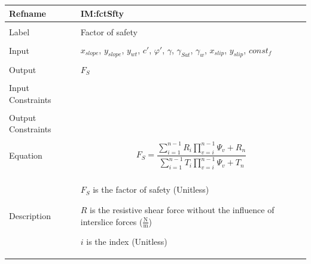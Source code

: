 \documentclass[12pt]{article}
\begin{document}
\noindent \begin{minipage}{\textwidth}
\begin{tabular}{p{} p{}}
\toprule \textbf{Refname} & \textbf{IM:fctSfty}
\label{IM:fctSfty}
\\ \midrule \\
Label & Factor of safety
        \\ \midrule \\
        Input & ${x_{slope}}$, ${y_{slope}}$, ${y_{wt}}$, $c'$, $φ'$, $γ$, ${γ_{Sat}}$, ${γ_{w}}$, ${x_{slip}}$, ${y_{slip}}$, $const_f$
                \\ \midrule \\
                Output & ${F_{S}}$
                         \\ \midrule \\
                         Input Constraints & \\ \midrule \\
                                             Output Constraints & \\ \midrule \\
                                                                  Equation & \begin{displaymath}
                                                                             {F_{S}}=\frac{\displaystyle\sum_{i=1}^{n-1}{R_{i} \displaystyle\prod_{v=i}^{n-1}{Ψ_{v}}}+R_{n}}{\displaystyle\sum_{i=1}^{n-1}{T_{i} \displaystyle\prod_{v=i}^{n-1}{Ψ_{v}}}+T_{n}}
                                                                             \end{displaymath}
                                                                             \\ \midrule \\
                                                                             Description & \begin{symbDescription}
                                                                                           \item{${F_{S}}$ is the factor of safety (Unitless)}
                                                                                           \item{$R$ is the resistive shear force without the influence of interslice forces ($\frac{\text{N}}{\text{m}}$)}
                                                                                           \item{$i$ is the index (Unitless)}

\end{symbDescription}
\end{tabular}
\end{minipage}
\end{document}
